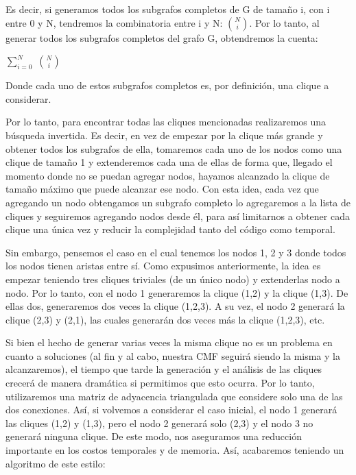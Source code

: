 Es decir, si generamos todos los subgrafos completos de G de tamaño {i}, con i entre 0 y N, tendremos la combinatoria entre i y N: ${N \choose i}$. Por lo tanto, al generar todos los subgrafos completos del grafo G, obtendremos la cuenta:

\begin{center}
 $\sum_{i=0}^{N}$ ${N \choose i}$
\end{center}

Donde cada uno de estos subgrafos completos es, por definición, una clique a considerar.

Por lo tanto, para encontrar todas las cliques mencionadas realizaremos una búsqueda invertida. Es decir, en vez de empezar por la clique más grande y obtener todos los subgrafos de ella, tomaremos cada uno de los nodos como una clique de tamaño 1 y extenderemos cada una de ellas de forma que, llegado el momento donde no se puedan agregar nodos, hayamos alcanzado la clique de tamaño máximo que puede alcanzar ese nodo. Con esta idea, cada vez que agregando un nodo obtengamos un subgrafo completo lo agregaremos a la lista de cliques y seguiremos agregando nodos desde él, para así limitarnos a obtener cada clique una única vez y reducir la complejidad tanto del código como temporal.

Sin embargo, pensemos el caso en el cual tenemos los nodos 1, 2 y 3 donde todos los nodos tienen aristas entre sí. Como expusimos anteriormente, la idea es empezar teniendo tres cliques triviales (de un único nodo) y extenderlas nodo a nodo. Por lo tanto, con el nodo 1 generaremos la clique (1,2) y la clique (1,3). De ellas dos, generaremos dos veces la clique (1,2,3). A su vez, el nodo 2 generará la clique (2,3) y (2,1), las cuales generarán dos veces más la clique (1,2,3), etc.

Si bien el hecho de generar varias veces la misma clique no es un problema en cuanto a soluciones (al fin y al cabo, nuestra CMF seguirá siendo la misma y la alcanzaremos), el tiempo que tarde la generación y el análisis de las cliques crecerá de manera dramática si permitimos que esto ocurra. Por lo tanto, utilizaremos una matriz de adyacencia triangulada que considere solo una de las dos conexiones. Así, si volvemos a considerar el caso inicial, el nodo 1 generará las cliques (1,2) y (1,3), pero el nodo 2 generará solo (2,3) y el nodo 3 no generará ninguna clique. De este modo, nos aseguramos una reducción importante en los costos temporales y de memoria. Así, acabaremos teniendo un algoritmo de este estilo:

